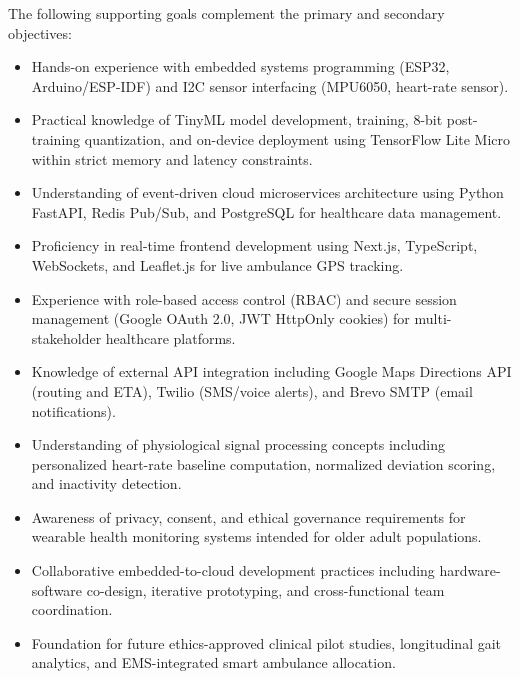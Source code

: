 The following supporting goals complement the primary and secondary objectives:
\begin{itemize}
\item Hands-on experience with embedded systems programming (ESP32, Arduino/ESP-IDF) and I2C sensor interfacing (MPU6050, heart-rate sensor).
\item Practical knowledge of TinyML model development, training, 8-bit post-training quantization, and on-device deployment using TensorFlow Lite Micro within strict memory and latency constraints.
\item Understanding of event-driven cloud microservices architecture using Python FastAPI, Redis Pub/Sub, and PostgreSQL for healthcare data management.
\item Proficiency in real-time frontend development using Next.js, TypeScript, WebSockets, and Leaflet.js for live ambulance GPS tracking.
\item Experience with role-based access control (RBAC) and secure session management (Google OAuth 2.0, JWT HttpOnly cookies) for multi-stakeholder healthcare platforms.
\item Knowledge of external API integration including Google Maps Directions API (routing and ETA), Twilio (SMS/voice alerts), and Brevo SMTP (email notifications).
\item Understanding of physiological signal processing concepts including personalized heart-rate baseline computation, normalized deviation scoring, and inactivity detection.
\item Awareness of privacy, consent, and ethical governance requirements for wearable health monitoring systems intended for older adult populations.
\item Collaborative embedded-to-cloud development practices including hardware-software co-design, iterative prototyping, and cross-functional team coordination.
\item Foundation for future ethics-approved clinical pilot studies, longitudinal gait analytics, and EMS-integrated smart ambulance allocation.
\end{itemize}